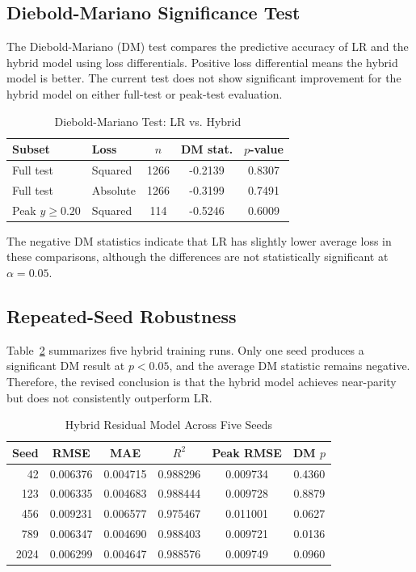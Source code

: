 \documentclass[journal]{IEEEtran}
\begin{document}
\subsection{Diebold-Mariano Significance Test}
The Diebold-Mariano (DM) test compares the predictive accuracy of LR and the hybrid model using loss differentials. Positive loss differential means the hybrid model is better. The current test does not show significant improvement for the hybrid model on either full-test or peak-test evaluation.

\begin{table}[!t]
\caption{Diebold-Mariano Test: LR vs. Hybrid}
\label{tab:dm_test}
\centering
\begin{tabular}{llccc}
\toprule
Subset & Loss & $n$ & DM stat. & $p$-value \\
\midrule
Full test & Squared & 1266 & -0.2139 & 0.8307 \\
Full test & Absolute & 1266 & -0.3199 & 0.7491 \\
Peak $y \ge 0.20$ & Squared & 114 & -0.5246 & 0.6009 \\
\bottomrule
\end{tabular}
\end{table}

The negative DM statistics indicate that LR has slightly lower average loss in these comparisons, although the differences are not statistically significant at $\alpha=0.05$.

\subsection{Repeated-Seed Robustness}
Table~\ref{tab:seed_results} summarizes five hybrid training runs. Only one seed produces a significant DM result at $p<0.05$, and the average DM statistic remains negative. Therefore, the revised conclusion is that the hybrid model achieves near-parity but does not consistently outperform LR.

\begin{table}[!t]
\caption{Hybrid Residual Model Across Five Seeds}
\label{tab:seed_results}
\centering
\begin{tabular}{rccccc}
\toprule
Seed & RMSE & MAE & $R^2$ & Peak RMSE & DM $p$ \\
\midrule
42 & 0.006376 & 0.004715 & 0.988296 & 0.009734 & 0.4360 \\
123 & 0.006335 & 0.004683 & 0.988444 & 0.009728 & 0.8879 \\
456 & 0.009231 & 0.006577 & 0.975467 & 0.011001 & 0.0627 \\
789 & 0.006347 & 0.004690 & 0.988403 & 0.009721 & 0.0136 \\
2024 & 0.006299 & 0.004647 & 0.988576 & 0.009749 & 0.0960 \\
\bottomrule
\end{tabular}
\end{table}
\end{document}
